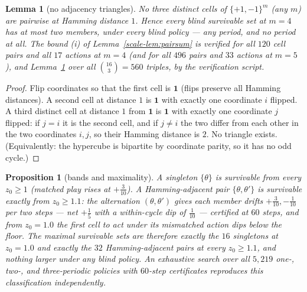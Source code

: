 \documentclass[10pt,twocolumn]{article}
\theoremstyle{plain}
\newtheorem{proposition}[theorem]{Proposition}
\newtheorem{lemma}[theorem]{Lemma}
\theoremstyle{definition}
\theoremstyle{remark}
\begin{document}
\begin{lemma}[no adjacency triangles]\label{scale-lem:triangle}
No three distinct cells of \(\{+1,-1\}^{m}\) (any \(m\)) are
pairwise at Hamming distance \(1\). Hence every blind survivable set
at \(m = 4\) has at most two members, under every blind policy ---
any period, and no period at all. The bound (i) of
Lemma~\ref{scale-lem:pairsum} is verified for all \(120\) cell pairs and
all \(17\) actions at \(m = 4\) (and for all \(496\) pairs and
\(33\) actions at \(m = 5\)), and
Lemma~\ref{scale-lem:triangle} over all \(\binom{16}{3} = 560\) triples, by the verification script.
\end{lemma}

\begin{proof}
Flip coordinates so that the first cell is \(\mathbf{1}\) (flips
preserve all Hamming distances). A second cell at distance \(1\) is
\(\mathbf{1}\) with exactly one coordinate \(i\) flipped. A third
distinct cell at distance \(1\) from \(\mathbf{1}\) is
\(\mathbf{1}\) with exactly one coordinate \(j\) flipped: if
\(j = i\) it is the second cell, and if \(j \neq i\) the two differ
from each other in the two coordinates \(i, j\), so their Hamming
distance is \(2\). No triangle exists. (Equivalently: the hypercube
is bipartite by coordinate parity, so it has no odd cycle.)
\end{proof}

\begin{proposition}[bands and maximality]\label{scale-prop:bands}
A singleton \(\{\theta\}\) is survivable from every \(z_{0} \ge 1\)
(matched play rises at \(+\tfrac3{10}\)). A Hamming-adjacent pair
\(\{\theta, \theta'\}\) is survivable exactly from
\(z_{0} \ge 1.1\): the alternation \((\theta, \theta')\) gives each
member drifts \(+\tfrac3{10}, -\tfrac1{10}\) per two steps --- net
\(+\tfrac15\) with a within-cycle dip of \(\tfrac1{10}\) --- certified
at \(60\) steps, and from \(z_{0} = 1.0\) the first cell to act under
its mismatched action dips below the floor. The maximal survivable
sets are therefore exactly the \(16\) singletons at \(z_{0} = 1.0\)
and exactly the \(32\) Hamming-adjacent pairs at every
\(z_{0} \ge 1.1\), and nothing larger under any blind policy. An
exhaustive search over all \(5{,}219\) one-, two-, and three-periodic
policies with \(60\)-step certificates reproduces this classification
independently.
\end{proposition}
\end{document}
